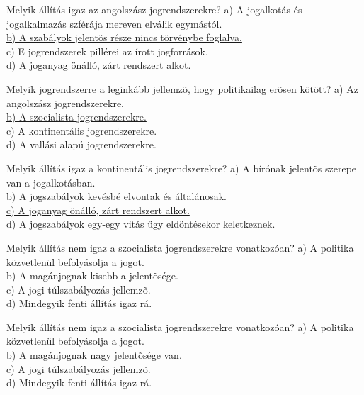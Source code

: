 \begin{frame}

\begin{tcolorbox}[title={13. Kérdés}]
Melyik állítás igaz az angolszász jogrendszerekre?
\tcblower
a) A jogalkotás és jogalkalmazás szférája mereven elválik egymástól.\\
\uline {b) A szabályok jelentõs része nincs törvénybe foglalva.}\\
c) E jogrendszerek pillérei az írott jogforrások.\\
d) A joganyag önálló, zárt rendszert alkot.
\end{tcolorbox}

\begin{tcolorbox}[title={14. Kérdés}]
Melyik jogrendszerre a leginkább jellemzõ, hogy politikailag erõsen kötött?
\tcblower
a) Az angolszász jogrendszerekre.\\
\uline {b) A szocialista jogrendszerekre.}\\
c) A kontinentális jogrendszerekre.\\
d) A vallási alapú jogrendszerekre.
\end{tcolorbox}

\begin{tcolorbox}[title={15. Kérdés}]
Melyik állítás igaz a kontinentális jogrendszerekre?
\tcblower
a) A bírónak jelentõs szerepe van a jogalkotásban.\\
b) A jogszabályok kevésbé elvontak és általánosak.\\
\uline {c) A joganyag önálló, zárt rendszert alkot.}\\
d) A jogszabályok egy-egy vitás ügy eldöntésekor keletkeznek.
\end{tcolorbox}

\begin{tcolorbox}[title={16. Kérdés}]
Melyik állítás nem igaz a szocialista jogrendszerekre vonatkozóan?
\tcblower
a) A politika közvetlenül befolyásolja a jogot.\\
b) A magánjognak kisebb a jelentõsége.\\
c) A jogi túlszabályozás jellemzõ.\\
\uline {d) Mindegyik fenti állítás igaz rá.}
\end{tcolorbox}

\end{frame}


\begin{frame}

\begin{tcolorbox}[title={17. Kérdés}]
Melyik állítás nem igaz a szocialista jogrendszerekre vonatkozóan?
\tcblower
a) A politika közvetlenül befolyásolja a jogot.\\
\uline {b) A magánjognak nagy jelentõsége van.}\\
c) A jogi túlszabályozás jellemzõ.\\
d) Mindegyik fenti állítás igaz rá.
\end{tcolorbox}

\end{frame}

